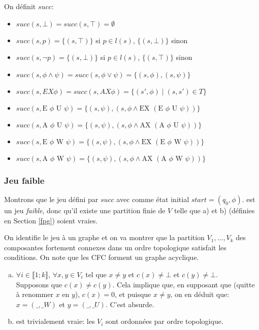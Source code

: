 \documentclass[10pt,a4paper]{article}
\begin{document}
On définit $succ$:
\begin{itemize}
\item$ succ(s, \bot) = succ(s, \top) = \emptyset$
\item $succ(s, p) = \{(s,\top)\}$ si $p \in l(s)$, $\{(s,\bot)\}$ sinon
\item $succ(s, \neg p) = \{(s,\bot)\}$ si $p \in l(s)$, $\{(s,\top)\}$ sinon
\item $succ(s,\phi \land \psi) = succ(s, \phi \lor \psi) = \{(s,\phi), (s,\psi) \}$
\item $succ(s,EX \phi) = succ(s, AX \phi) = \{ (s', \phi) \mid (s,s') \in T \} $
\item $succ(s, \mbox{E } \phi \mbox{ U } \psi) = \{ (s,\psi), (s, \phi \land \mbox{EX }  (\mbox{E } \phi \mbox{ U } \psi)) \}$
\item $succ(s, \mbox{A } \phi \mbox{ U } \psi) = \{ (s,\psi), (s, \phi \land \mbox{AX }  (\mbox{A } \phi \mbox{ U } \psi)) \}$
\item $succ(s, \mbox{E } \phi \mbox{ W } \psi) = \{ (s,\psi), (s, \phi \land \mbox{EX }  (\mbox{E } \phi \mbox{ W } \psi)) \}$
\item $succ(s, \mbox{A } \phi \mbox{ W } \psi) = \{ (s,\psi), (s, \phi \land \mbox{AX } (\mbox{A } \phi \mbox{ W } \psi)) \}$
\end{itemize}

\subsubsection{Jeu faible}
Montrons que le jeu défini par $succ$ avec comme état initial $start = (q_0, \phi)$.
 est un jeu \emph{faible}, donc qu'il existe une partition finie de $V$ telle que a) et b) (définies en Section \ref{fpg}) soient vraies.

On identifie le jeu à un graphe et on va montrer que la partition $V_1, \dots, V_k$ des composantes fortement connexes dans un ordre topologique satisfait les conditions. On note que les CFC forment un graphe acyclique.

\begin{enumerate}[a)]
\item $\forall i \in \llbracket 1 ; k \rrbracket$, $\forall x,y \in V_i$ tel que $x \neq y$ et $c(x) \neq \bot$ et $c(y) \neq \bot$.\\
Supposons que $c(x) \neq c(y)$. Cela implique que, en supposant que (quitte à renommer $x$ en $y$), $c(x) = 0$, et puisque $x \neq y$, on en déduit que: $x = (\_,\_W)$ et $y = (\_,\_U)$. C'est absurde.

\item est trivialement vraie: les $V_i$ sont ordonnées par ordre topologique.
\end{enumerate}
\end{document}
